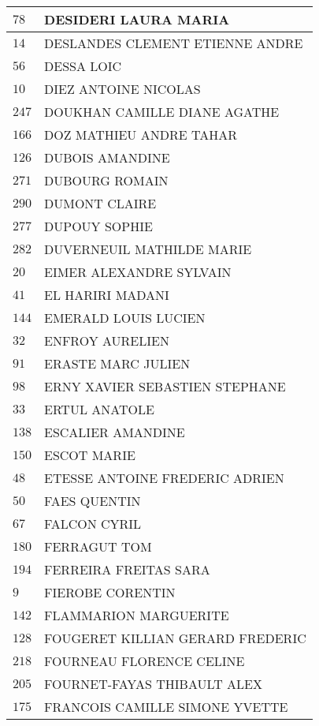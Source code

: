 \begin{xltabular}{\linewidth}{|l|X|}
    \hline
    $78$ & DESIDERI LAURA MARIA \\
    \hline
    $14$ & DESLANDES CLEMENT ETIENNE ANDRE \\
    \hline
    $56$ & DESSA LOIC \\
    \hline
    $10$ & DIEZ ANTOINE NICOLAS \\
    \hline
    $247$ & DOUKHAN CAMILLE DIANE AGATHE \\
    \hline
    $166$ & DOZ MATHIEU ANDRE TAHAR \\
    \hline
    $126$ & DUBOIS AMANDINE \\
    \hline
    $271$ & DUBOURG ROMAIN \\
    \hline
    $290$ & DUMONT CLAIRE \\
    \hline
    $277$ & DUPOUY SOPHIE \\
    \hline
    $282$ & DUVERNEUIL MATHILDE MARIE \\
    \hline
    $20$ & EIMER ALEXANDRE SYLVAIN \\
    \hline
    $41$ & EL HARIRI MADANI \\
    \hline
    $144$ & EMERALD LOUIS LUCIEN \\
    \hline
    $32$ & ENFROY AURELIEN \\
    \hline
    $91$ & ERASTE MARC JULIEN \\
    \hline
    $98$ & ERNY XAVIER SEBASTIEN STEPHANE \\
    \hline
    $33$ & ERTUL ANATOLE \\
    \hline
    $138$ & ESCALIER AMANDINE \\
    \hline
    $150$ & ESCOT MARIE \\
    \hline
    $48$ & ETESSE ANTOINE FREDERIC ADRIEN \\
    \hline
    $50$ & FAES QUENTIN \\
    \hline
    $67$ & FALCON CYRIL \\
    \hline
    $180$ & FERRAGUT TOM \\
    \hline
    $194$ & FERREIRA FREITAS SARA \\
    \hline
    $9$ & FIEROBE CORENTIN \\
    \hline
    $142$ & FLAMMARION MARGUERITE \\
    \hline
    $128$ & FOUGERET KILLIAN GERARD FREDERIC \\
    \hline
    $218$ & FOURNEAU FLORENCE CELINE \\
    \hline
    $205$ & FOURNET-FAYAS THIBAULT ALEX \\
    \hline
    $175$ & FRANCOIS CAMILLE SIMONE YVETTE \\

\end{xltabular}
